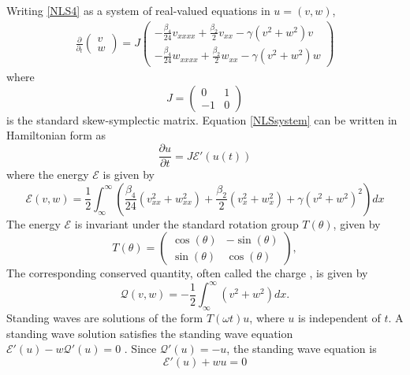 \documentclass[12pt]{article}
\def\calE{{\mathcal E}}
\def\calQ{{\mathcal Q}}
\begin{document}
Writing \cref{NLS4} as a system of real-valued equations in $u = (v, w)$,
\begin{align}\label{NLSsystem}
\frac{\partial}{\partial_t}
\begin{pmatrix}v \\ w \end{pmatrix}
= J \begin{pmatrix}
-\frac{\beta_4}{24} v_{xxxx} + \frac{\beta_2}{2} v_{xx} - \gamma (v^2 + w^2)v \\
-\frac{\beta_4}{24} w_{xxxx} + \frac{\beta_2}{2} w_{xx} - \gamma (v^2 + w^2)w 
\end{pmatrix}
\end{align}
where 
\[
J = \begin{pmatrix}0 & 1 \\ -1 & 0 \end{pmatrix}
\]
is the standard skew-symplectic matrix. Equation \cref{NLSsystem} can be written in Hamiltonian form as 
\begin{equation}\label{NLSHam}
\frac{\partial u}{\partial t} = J \calE'(u(t))
\end{equation}
where the energy $\calE$ is given by
\begin{equation}\label{defH}
\calE(v, w) = \frac{1}{2} \int_{\infty}^\infty \left( \frac{\beta_4}{24}\left( v_{xx}^2 + w_{xx}^2 \right) + \frac{\beta_2}{2}\left( v_{x}^2 + w_{x}^2 \right) + \gamma \left(v^2 + w^2 \right)^2 \right) dx
\end{equation}
The energy $\mathcal{E}$ is invariant under the standard rotation group $T(\theta)$, given by
\begin{equation}\label{Ttheta}
T(\theta) = \begin{pmatrix}
\cos(\theta) & -\sin(\theta) \\
\sin(\theta)& \cos(\theta)
\end{pmatrix},
\end{equation}
The corresponding conserved quantity, often called the charge \cite[Section 6.C]{Grillakis1987}, is given by
\begin{equation}\label{defQ}
\mathcal{Q}(v, w) = -\frac{1}{2} \int_{\infty}^\infty \left( v^2 + w^2\right) dx.
\end{equation}
Standing waves are solutions of the form $T(\omega t) u$, where $u$ is independent of $t$. A standing wave solution satisfies the standing wave equation $\calE'(u) - w \calQ'(u) = 0$ \cite[2.15]{Grillakis1987}. Since $\calQ'(u) = -u$, the standing wave equation is
\begin{equation}\label{standingwaveeq}
\calE'(u) + w u = 0
\end{equation}
\end{document}
